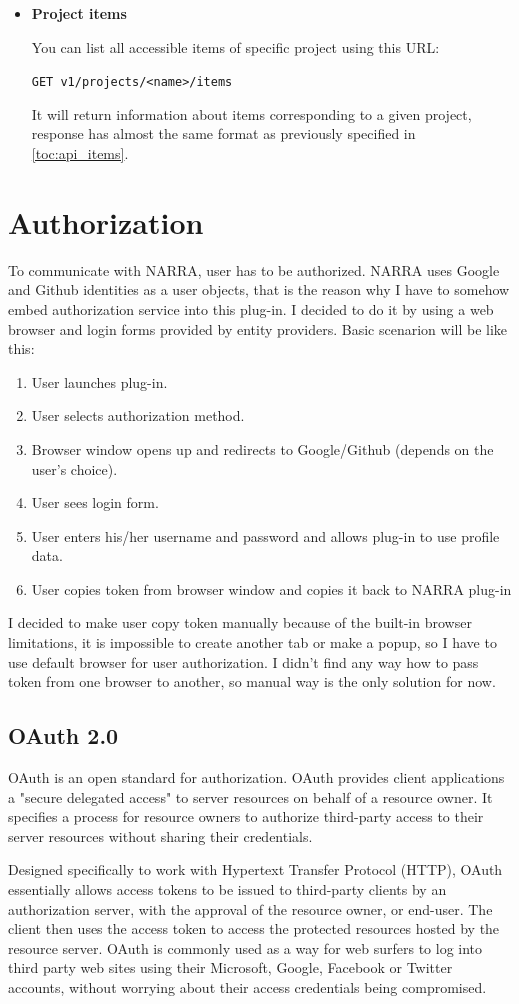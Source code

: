 \documentclass[thesis=B,english]{FITthesis}[2012/10/20]
\begin{document}
\begin{itemize}
		\item \textbf{Project items}

You can list all accessible items of specific project using this URL:

\texttt{GET v1/projects/<name>/items}

It will return information about items corresponding to a given project, response has almost the same format as previously specified in \ref{toc:api_items}.
	\end{itemize}
\section{Authorization}
To communicate with NARRA, user has to be authorized. NARRA uses Google and Github identities as a user objects, that is the reason why I have to somehow embed authorization service into this plug-in. I decided to do it by using a web browser and login forms provided by entity providers. Basic scenarion will be like this:
	\begin{enumerate}
		\item User launches plug-in.
		\item User selects authorization method.
		\item Browser window opens up and redirects to Google/Github (depends on the user's choice).
		\item User sees login form.
		\item User enters his/her username and password and allows plug-in to use profile data.
		\item User copies token from browser window and copies it back to NARRA plug-in
	\end{enumerate}
I decided to make user copy token manually because of the built-in browser limitations, it is impossible to create another tab or make a popup, so I have to use default browser for user authorization. I didn't find any way how to pass token from one browser to another, so manual way is the only solution for now.   
\subsection{OAuth 2.0}
OAuth is an open standard for authorization. OAuth provides client applications a "secure delegated access" to server resources on behalf of a resource owner. It specifies a process for resource owners to authorize third-party access to their server resources without sharing their credentials. 

Designed specifically to work with Hypertext Transfer Protocol (HTTP), OAuth essentially allows access tokens to be issued to third-party clients by an authorization server, with the approval of the resource owner, or end-user. The client then uses the access token to access the protected resources hosted by the resource server. OAuth is commonly used as a way for web surfers to log into third party web sites using their Microsoft, Google, Facebook or Twitter accounts, without worrying about their access credentials being compromised.\cite{oauth}
\end{document}
